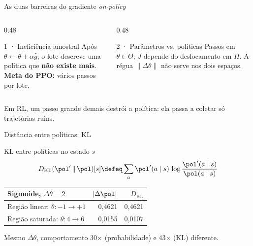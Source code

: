 \documentclass[aspectratio=169, 11pt]{beamer}
\newcommand{\ghat}{\hat{g}}
\newcommand{\KL}{D_{\mathrm{KL}}}
\newcommand{\azul}[1]{{\color{rlAzulClaro}#1}}
\begin{document}
\begin{frame}{As duas barreiras do gradiente \emph{on-policy}}
  \begin{columns}[T]
    \begin{column}{0.48\textwidth}
      \begin{teobox}{1 · Ineficiência amostral}
        \small Após $\theta\leftarrow\theta+\alpha\ghat$, o lote descreve uma política que
        \textbf{não existe mais}.\\ \textbf{Meta do PPO:} vários passos por lote.
      \end{teobox}
    \end{column}
    \begin{column}{0.48\textwidth}
      \begin{teobox}{2 · Parâmetros vs. políticas}
        \small Passos em $\theta\in\Theta$; $J$ depende do deslocamento em $\Pi$.
        A régua $\|\Delta\theta\|$ não serve nos dois espaços.
      \end{teobox}
    \end{column}
  \end{columns}

  \begin{alertabox}[title={Colapso de desempenho}]
    Em RL, um passo grande demais destrói a política: ela passa a coletar só trajetórias ruins.
  \end{alertabox}
\end{frame}

\begin{frame}{Distância entre políticas: KL}
  \begin{defbox}{KL entre políticas no estado $s$}
    \[
      \KL(\pol'\,\|\,\pol)[s] \defeq \sum_{a}\pol'(a\mid s)\,\log\frac{\pol'(a\mid s)}{\pol(a\mid s)}
    \]
  \end{defbox}

  \begin{center}\small
    \begin{tabular}{@{}lrr@{}}
      \toprule
      \textbf{Sigmoide, $\Delta\theta = 2$} & $|\Delta\pol|$ & $\KL$ \\
      \midrule
      Região linear: $\theta: -1\to+1$ & \azul{0,4621} & \azul{0,4621} \\
      Região saturada: $\theta: 4\to6$ & {\color{rlLaranja}0,0155} & {\color{rlLaranja}0,0107} \\
      \bottomrule
    \end{tabular}
  \end{center}
  \begin{ideiabox}
    Mesmo $\Delta\theta$, comportamento 30$\times$ (probabilidade) e 43$\times$ (KL) diferente.
  \end{ideiabox}
\end{frame}
\end{document}
